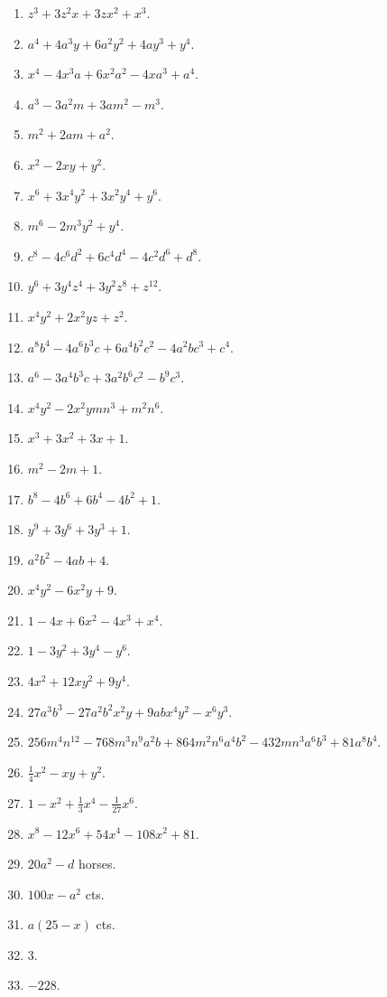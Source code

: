 \documentclass{book}
\begin{document}
\begin{enumerate}

\item  $z^3 + 3z^2x + 3zx^2 + x^3$.
\item  $a^4 + 4a^3y + 6a^2y^2 + 4ay^3 + y^4$.
\item  $x^4 - 4x^3a + 6x^2a^2 - 4xa^3 + a^4$.
\item  $a^3 - 3a^2m + 3am^2 - m^3$.
\item  $m^2 + 2am + a^2$.
\item  $x^2 - 2xy + y^2$.
\item  $x^6 + 3x^4y^2 + 3x^2y^4 + y^6$.
\item  $m^6 - 2m^3y^2 + y^4$.
\item  $c^8 - 4c^6d^2 + 6c^4d^4 - 4c^2d^6 + d^8$.
\item  $y^6 + 3y^4z^4 + 3y^2z^8 + z^{12}$.
\item  $x^4y^2 + 2x^2yz + z^2$.

\item  $a^8b^4 - 4a^6b^3c + 6a^4b^2c^2-4a^2bc^3 + c^4$.

\item  $a^6 - 3a^4b^3c + 3a^2b^6c^2-b^9c^3$.
\item  $x^4y^2 - 2x^2ymn^3 + m^2n^6$.
\item  $x^3 + 3x^2 + 3x + 1$.
\item  $m^2 - 2m + 1$.
\item  $b^8 - 4b^6 + 6b^4 - 4b^2 + 1$.
\item  $y^9 + 3y^6 + 3y^3 + 1$.
\item  $a^2b^2 - 4ab + 4$.
\item  $x^4y^2 - 6x^2y + 9$.
\item  $1 - 4x + 6x^2 - 4x^3 + x^4$.
\item  $1 - 3y^2 + 3y^4 - y^6$.
\item  $4x^2 + 12xy^2 + 9y^4$.
\item  $27a^3b^3 - 27a^2b^2x^2y + 9abx^4y^2 - x^6y^3$.
\item  $256m^4n^{12} - 768m^3n^9a^2b + 864m^2n^6a^4b^2
          - 432mn^3a^6b^3 + 81a^8b^4$.
\item  $\frac{1}{4}x^2 - xy + y^2$.
\item  $1 - x^2 + \frac{1}{3}x^4 - \frac{1}{27}x^6$.
\item  $x^8 - 12x^6 + 54x^4 - 108x^2 + 81$.
\item  $20a^2 - d$ horses.
\item  $100x - a^2$ cts.
\item  $a(25 - x)$ cts.
\item  $3$.
\item  $-228$.
\end{enumerate}
\end{document}
